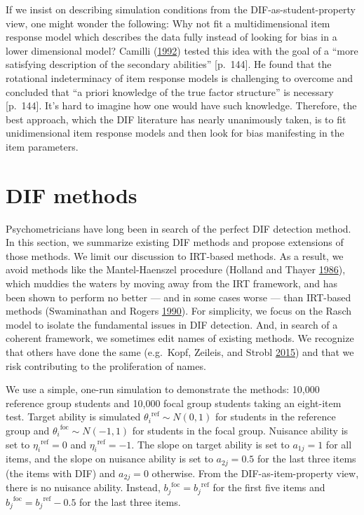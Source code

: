 \documentclass[
  11pt,
]{article}
\begin{document}
If we insist on describing simulation conditions from the DIF-as-student-property view, one might wonder the following: Why not fit a multidimensional item response model which describes the data fully instead of looking for bias in a lower dimensional model? Camilli (\protect\hyperlink{ref-camilli1992conceptual}{1992}) tested this idea with the goal of a \enquote{more satisfying description of the secondary abilities} {[}p.~144{]}. He found that the rotational indeterminacy of item response models is challenging to overcome and concluded that \enquote{a priori knowledge of the true factor structure} is necessary {[}p.~144{]}. It's hard to imagine how one would have such knowledge. Therefore, the best approach, which the DIF literature has nearly unanimously taken, is to fit unidimensional item response models and then look for bias manifesting in the item parameters.

\hypertarget{dif-methods}{%
\section{DIF methods}\label{dif-methods}}

Psychometricians have long been in search of the perfect DIF detection method. In this section, we summarize existing DIF methods and propose extensions of those methods. We limit our discussion to IRT-based methods. As a result, we avoid methods like the Mantel-Haenszel procedure (Holland and Thayer \protect\hyperlink{ref-holland1986differential}{1986}), which muddies the waters by moving away from the IRT framework, and has been shown to perform no better --- and in some cases worse --- than IRT-based methods (Swaminathan and Rogers \protect\hyperlink{ref-swaminathan1990detecting}{1990}). For simplicity, we focus on the Rasch model to isolate the fundamental issues in DIF detection. And, in search of a coherent framework, we sometimes edit names of existing methods. We recognize that others have done the same (e.g.~Kopf, Zeileis, and Strobl \protect\hyperlink{ref-kopf2015framework}{2015}) and that we risk contributing to the proliferation of names.

We use a simple, one-run simulation to demonstrate the methods: 10,000 reference group students and 10,000 focal group students taking an eight-item test. Target ability is simulated \({\theta_i}^{\text{ref}} \sim N(0,1)\) for students in the reference group and \({\theta_i}^{\text{foc}} \sim N(-1,1)\) for students in the focal group. Nuisance ability is set to \({\eta_i}^{\text{ref}} = 0\) and \({\eta_i}^{\text{ref}} = -1\). The slope on target ability is set to \(a_{1j} = 1\) for all items, and the slope on nuisance ability is set to \(a_{2j} = 0.5\) for the last three items (the items with DIF) and \(a_{2j} = 0\) otherwise. From the DIF-as-item-property view, there is no nuisance ability. Instead, \({b_j}^{\text{foc}} = {b_j}^{\text{ref}}\) for the first five items and \({b_j}^{\text{foc}} = {b_j}^{\text{ref}} - 0.5\) for the last three items.
\end{document}
